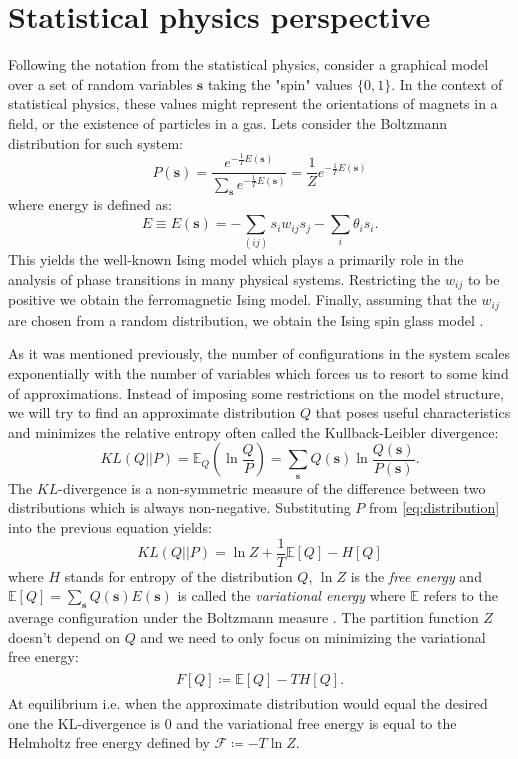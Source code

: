 \section{Statistical physics perspective}
Following the notation from the statistical physics, consider a graphical model over a set of random variables $\mathbf{s}$ taking the "spin" values $\{0, 1 \}$. In the context of statistical physics, these values might represent the orientations of magnets in a field, or the existence of particles in a gas. Lets consider the Boltzmann distribution for such system:
\begin{equation}
P(\mathbf{s}) = \frac{ e^{-\frac{1}{T}E(\mathbf{s})}}{\sum_{\mathbf{s}} e^{-\frac{1}{T}E(\mathbf{s})}} = \frac{1}{Z}e^{-\frac{1}{T}E(\mathbf{s})}
\label{eq:distribution}
\end{equation}
where energy is defined as:
$$E \equiv E (\mathbf{s}) = - \sum_{(ij)} s_i w_{ij} s_j - \sum_i \theta_i s_i.$$
This yields the well-known Ising model which plays a primarily role in the analysis of phase transitions in many physical systems. Restricting the $w_{ij}$ to be positive we obtain the ferromagnetic Ising model. Finally, assuming that the $w_{ij}$ are chosen from a random distribution, we obtain the Ising spin glass model \cite{yedidia2001idiosyncratic}. 

As it was mentioned previously, the number of configurations in the system scales exponentially with the number of variables which forces us to resort to some kind of approximations. Instead of imposing some restrictions on the model structure, we will try to find an approximate distribution $Q$ that poses useful characteristics and minimizes the relative entropy often called the Kullback-Leibler divergence:
\begin{equation}
KL(Q || P)  = \mathbb{E}_{Q}\left( \ln \frac{Q}{P} \right) = \sum_{\mathbf{s}} Q(\mathbf{s}) \ln \frac{Q(\mathbf{s})}{P(\mathbf{s})} .
\label{eq:kl}
\end{equation}
The $KL$-divergence is a non-symmetric measure of the difference between two distributions which is always non-negative. Substituting $P$ from \ref{eq:distribution} into the previous equation yields:
$$ KL(Q||P) = \ln Z + \frac{1}{T}\mathbb{E}[Q] - H[Q]$$
where $H$ stands for entropy of the distribution $Q$, $\ln Z$ is the \emph{free energy} and $\mathbb{E}[Q] = \sum_{\mathbf{s}} Q(\mathbf{s})E(\mathbf{s})$ is called the \emph{variational energy} where $\mathbb{E}$ refers to the average configuration under the Boltzmann measure \cite{opper2001advanced}. The partition function $Z$ doesn't depend on $Q$ and we need to only focus on minimizing the variational free energy:
\begin{align}
\begin{split}
F[Q]  \coloneqq \mathbb{E}[Q] - TH[Q].
\label{eq:gibbsFreeEnergy}
\end{split}
\end{align}
At equilibrium i.e. when the approximate distribution would equal the desired one the KL-divergence is $0$ and the variational free energy is equal to the Helmholtz free energy defined by 
$\mathcal{F} \coloneqq -T \ln Z$. 

